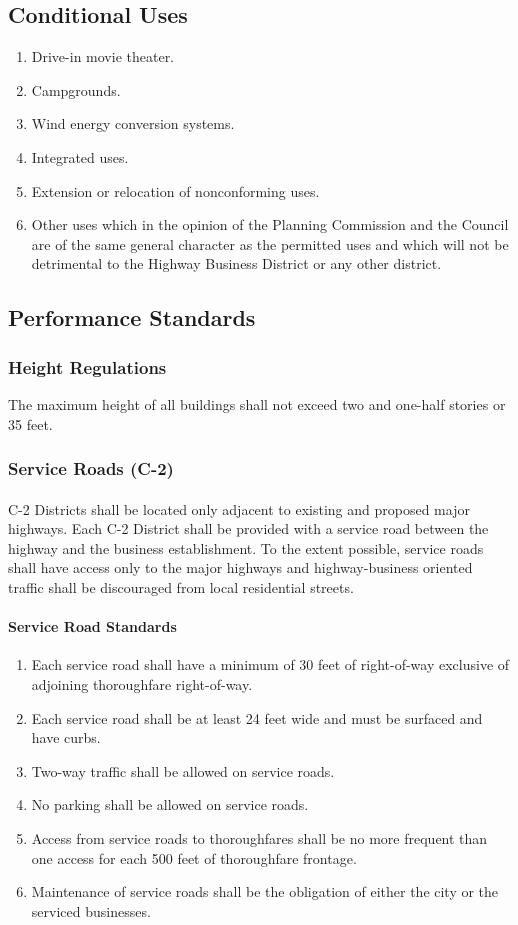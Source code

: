 \subsection{Conditional Uses}
\begin{enumerate}[{\indent}1)]
    \item Drive-in movie theater.  
    \item Campgrounds.  
    \item Wind energy conversion systems.
    \item Integrated uses.
    \item Extension or relocation of nonconforming uses.
    \item Other uses which in the opinion of the Planning Commission and the Council are of the same general character as the permitted uses and which will not be detrimental to the Highway Business District or any other district.
\end{enumerate}
\subsection{Performance Standards}
\subsubsection{Height Regulations}
The maximum height of all buildings shall not exceed two and one-half stories or 35 feet.
\subsubsection{Service Roads (C-2)}
\paragraph{}
C-2 Districts shall be located only adjacent to existing and proposed major highways. Each C-2 District shall be provided with a service road between the highway and the business establishment. To the extent possible, service roads shall have access only to the major highways and highway-business oriented traffic shall be discouraged from local residential streets.
\paragraph{Service Road Standards}
\begin{enumerate}[{\indent}1)]
    \item Each service road shall have a minimum of 30 feet of right-of-way exclusive of adjoining thoroughfare right-of-way.
    \item Each service road shall be at least 24 feet wide and must be surfaced and have curbs.
    \item Two-way traffic shall be allowed on service roads.
    \item No parking shall be allowed on service roads.
    \item Access from service roads to thoroughfares shall be no more frequent than one access for each 500 feet of thoroughfare frontage.
    \item Maintenance of service roads shall be the obligation of either the city or the serviced businesses.
\end{enumerate}
